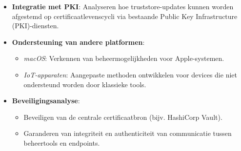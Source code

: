 \documentclass[a0,portrait]{hogent-poster}
\begin{document}
\begin{multicols}{2}
\begin{itemize}
    \item \textbf{Integratie met PKI}: Analyseren hoe truststore-updates kunnen worden afgestemd op certificaatlevenscycli via bestaande Public Key Infrastructure (PKI)-diensten.
    
    \item \textbf{Ondersteuning van andere platformen}:
    \begin{itemize}
        \item \textit{macOS}: Verkennen van beheermogelijkheden voor Apple-systemen.
        \item \textit{IoT-apparaten}: Aangepaste methoden ontwikkelen voor devices die niet ondersteund worden door klassieke tools.
    \end{itemize}
    
    \item \textbf{Beveiligingsanalyse}:
    \begin{itemize}
        \item Beveiligen van de centrale certificaatbron (bijv. HashiCorp Vault).
        \item Garanderen van integriteit en authenticiteit van communicatie tussen beheertools en endpoints.
    \end{itemize}
\end{itemize}

\end{multicols}
\end{document}
